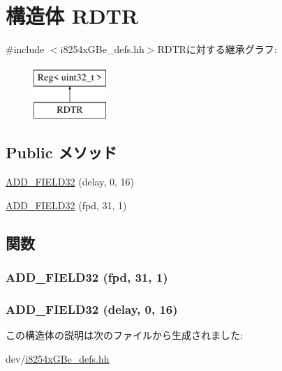 \hypertarget{structiGbReg_1_1Regs_1_1RDTR}{
\section{構造体 RDTR}
\label{structiGbReg_1_1Regs_1_1RDTR}
}


{\ttfamily \#include $<$i8254xGBe\_\-defs.hh$>$}RDTRに対する継承グラフ:\begin{figure}[H]
\begin{center}
\leavevmode
\includegraphics[height=2cm]{structiGbReg_1_1Regs_1_1RDTR}
\end{center}
\end{figure}
\subsection*{Public メソッド}
\begin{DoxyCompactItemize}
\item 
\hyperlink{structiGbReg_1_1Regs_1_1RDTR_ae4438b8e314e26ef05f54feb661d0b30}{ADD\_\-FIELD32} (delay, 0, 16)
\item 
\hyperlink{structiGbReg_1_1Regs_1_1RDTR_ad89242b6ea9fb575bd1132d1573b2a47}{ADD\_\-FIELD32} (fpd, 31, 1)
\end{DoxyCompactItemize}


\subsection{関数}
\hypertarget{structiGbReg_1_1Regs_1_1RDTR_ad89242b6ea9fb575bd1132d1573b2a47}{
\subsubsection[{ADD\_\-FIELD32}]{\setlength{\rightskip}{0pt plus 5cm}ADD\_\-FIELD32 (fpd, \/  31, \/  1)}}
\label{structiGbReg_1_1Regs_1_1RDTR_ad89242b6ea9fb575bd1132d1573b2a47}
\hypertarget{structiGbReg_1_1Regs_1_1RDTR_ae4438b8e314e26ef05f54feb661d0b30}{
\subsubsection[{ADD\_\-FIELD32}]{\setlength{\rightskip}{0pt plus 5cm}ADD\_\-FIELD32 (delay, \/  0, \/  16)}}
\label{structiGbReg_1_1Regs_1_1RDTR_ae4438b8e314e26ef05f54feb661d0b30}


この構造体の説明は次のファイルから生成されました:\begin{DoxyCompactItemize}
\item 
dev/\hyperlink{i8254xGBe__defs_8hh}{i8254xGBe\_\-defs.hh}\end{DoxyCompactItemize}
